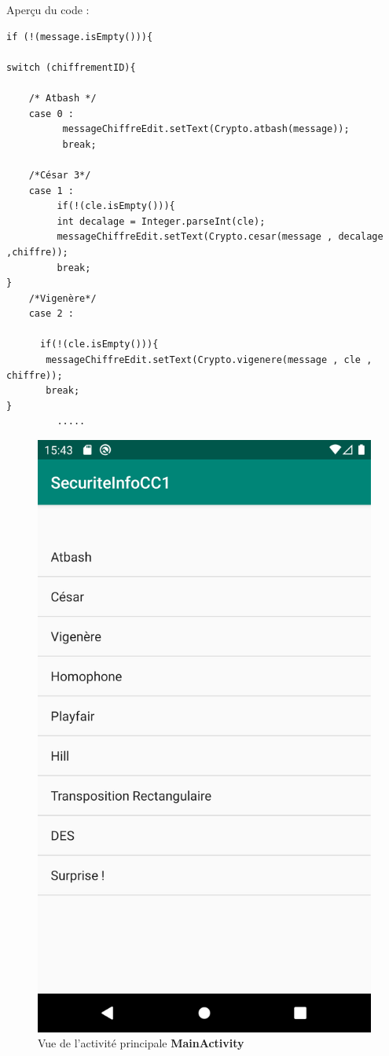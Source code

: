 \documentclass{article}
\begin{document}
Aperçu du code : 
\vspace{1\baselineskip}

\begin{verbatim}
if (!(message.isEmpty())){

switch (chiffrementID){

    /* Atbash */
    case 0 :
          messageChiffreEdit.setText(Crypto.atbash(message));
          break;

    /*César 3*/
    case 1 :
		 if(!(cle.isEmpty())){
         int decalage = Integer.parseInt(cle);
         messageChiffreEdit.setText(Crypto.cesar(message , decalage ,chiffre));
         break;
}
    /*Vigenère*/
    case 2 :

      if(!(cle.isEmpty())){ 
       messageChiffreEdit.setText(Crypto.vigenere(message , cle , chiffre));                         
       break;
}
         .....
\end{verbatim}

\begin{figure}[h!]
\centering
\includegraphics[scale=0.15]{./img/main.png}
\caption{Vue de l'activité principale \textbf{MainActivity} \label{fig:main}}
\end{figure}
\end{document}
